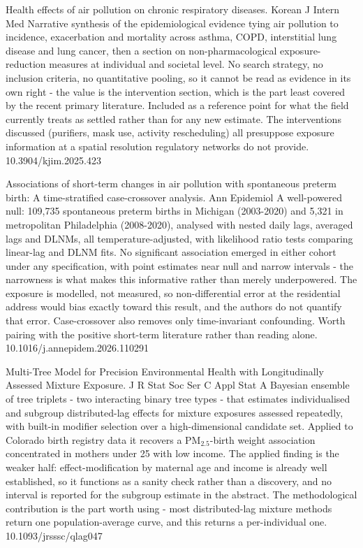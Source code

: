 \documentclass[10pt]{article}
\begin{document}
{Health effects of air pollution on chronic respiratory diseases.}
{Korean J Intern Med}
{Narrative synthesis of the epidemiological evidence tying air pollution to incidence, exacerbation and mortality across asthma, COPD, interstitial lung disease and lung cancer, then a section on non-pharmacological exposure-reduction measures at individual and societal level. No search strategy, no inclusion criteria, no quantitative pooling, so it cannot be read as evidence in its own right - the value is the intervention section, which is the part least covered by the recent primary literature. Included as a reference point for what the field currently treats as settled rather than for any new estimate. The interventions discussed (purifiers, mask use, activity rescheduling) all presuppose exposure information at a spatial resolution regulatory networks do not provide.}
{10.3904/kjim.2025.423}


{Associations of short-term changes in air pollution with spontaneous preterm birth: A time-stratified case-crossover analysis.}
{Ann Epidemiol}
{A well-powered null: 109,735 spontaneous preterm births in Michigan (2003-2020) and 5,321 in metropolitan Philadelphia (2008-2020), analysed with nested daily lags, averaged lags and DLNMs, all temperature-adjusted, with likelihood ratio tests comparing linear-lag and DLNM fits. No significant association emerged in either cohort under any specification, with point estimates near null and narrow intervals - the narrowness is what makes this informative rather than merely underpowered. The exposure is modelled, not measured, so non-differential error at the residential address would bias exactly toward this result, and the authors do not quantify that error. Case-crossover also removes only time-invariant confounding. Worth pairing with the positive short-term literature rather than reading alone.}
{10.1016/j.annepidem.2026.110291}


{Multi-Tree Model for Precision Environmental Health with Longitudinally Assessed Mixture Exposure.}
{J R Stat Soc Ser C Appl Stat}
{A Bayesian ensemble of tree triplets - two interacting binary tree types - that estimates individualised and subgroup distributed-lag effects for mixture exposures assessed repeatedly, with built-in modifier selection over a high-dimensional candidate set. Applied to Colorado birth registry data it recovers a PM$_{2.5}$-birth weight association concentrated in mothers under 25 with low income. The applied finding is the weaker half: effect-modification by maternal age and income is already well established, so it functions as a sanity check rather than a discovery, and no interval is reported for the subgroup estimate in the abstract. The methodological contribution is the part worth using - most distributed-lag mixture methods return one population-average curve, and this returns a per-individual one.}
{10.1093/jrsssc/qlag047}
\end{document}

